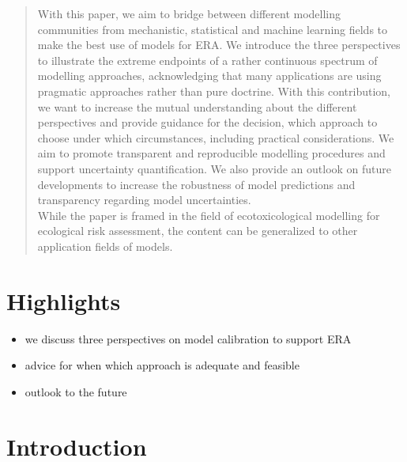\documentclass [english,11pt]{article} %
\begin{document}
\begin{abstract}
With this paper, we aim to bridge between different modelling communities from mechanistic, statistical and machine learning fields to make the best use of models for ERA. We introduce the three perspectives to illustrate the extreme endpoints of a rather continuous spectrum of modelling approaches, acknowledging that many applications are using pragmatic approaches rather than pure doctrine.
With this contribution, we want to increase the mutual understanding about the different perspectives and provide guidance for the decision, which approach to choose under which circumstances, including practical considerations. We aim to promote transparent and reproducible modelling procedures and support uncertainty quantification. We also provide an outlook on future developments to increase the robustness of model predictions and transparency regarding model uncertainties.\\

While the paper is framed in the field of ecotoxicological modelling for ecological risk assessment, the content can be generalized to other application fields of models.

\end{abstract}

\section*{Highlights}
\begin{itemize}
\item we discuss three perspectives on model calibration to support ERA
\item advice for when which approach is adequate and feasible
\item outlook to the future
\end{itemize}

\newpage
\section*{Introduction}     
\end{document}
